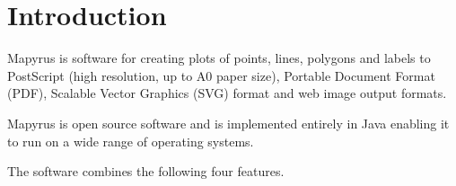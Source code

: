 
\section{Introduction}

Mapyrus is software for
creating plots of points, lines, polygons and labels 
to PostScript (high resolution, up to A0 paper size),
Portable Document Format (PDF),
Scalable Vector Graphics (SVG) format
and web image output formats.

Mapyrus is open source software and is implemented entirely in Java
enabling it to run on a wide range of operating systems.

The software combines the following four features.

